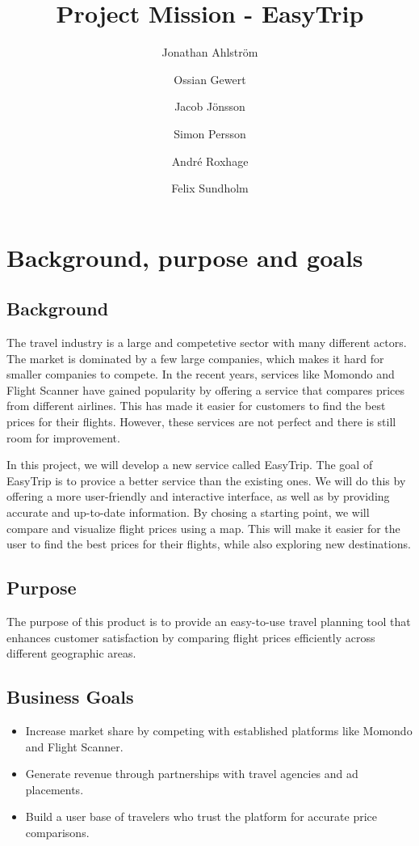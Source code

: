 \documentclass[a4paper]{article}
\title{Project Mission - EasyTrip}
\author{Jonathan Ahlström \and Ossian Gewert \and Jacob Jönsson \and Simon Persson \and André Roxhage \and Felix Sundholm}
\begin{document}
\maketitle

\begin{center}
\end{center}

\tableofcontents  %

\section{Background, purpose and goals}
\subsection{Background}
The travel industry is a large and competetive sector with many different actors.
The market is dominated by a few large companies,
which makes it hard for smaller companies to compete.
In the recent years,
services like Momondo and Flight Scanner have gained popularity by offering a service that compares prices from different airlines.
This has made it easier for customers to find the best prices for their flights.
However, these services are not perfect and there is still room for improvement. 

In this project, we will develop a new service called EasyTrip. The goal of EasyTrip is to provice a better service than the existing ones. We will do this by offering a more user-friendly and interactive interface, as well as by providing accurate and up-to-date information. By chosing a starting point, we will compare and visualize flight prices using a map. This will make it easier for the user to find the best prices for their flights, while also exploring new destinations.

\subsection{Purpose}
The purpose of this product is to provide an easy-to-use travel planning tool that enhances customer satisfaction by comparing flight prices efficiently across different geographic areas.

\subsection{Business Goals}
\begin{itemize}
    \item Increase market share by competing with established platforms like Momondo and Flight Scanner.
    \item Generate revenue through partnerships with travel agencies and ad placements.
    \item Build a user base of travelers who trust the platform for accurate price comparisons.
\end{itemize}
\end{document}
